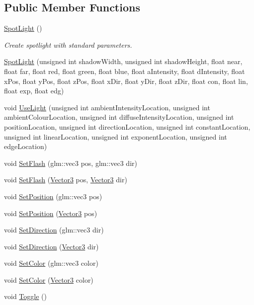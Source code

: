 \subsection*{Public Member Functions}
\begin{DoxyCompactItemize}
\item 
\mbox{\label{class_spot_light_ae4045cd7c8c6d18af39b57c9cf6f9ce6}} 
\mbox{\hyperlink{class_spot_light_ae4045cd7c8c6d18af39b57c9cf6f9ce6}{Spot\+Light}} ()
\begin{DoxyCompactList}\small\item\em Create spotlight with standard parameters. \end{DoxyCompactList}\item 
\mbox{\hyperlink{class_spot_light_a3c6af5cf0f784ab6375f0e12eb72dd55}{Spot\+Light}} (unsigned int shadow\+Width, unsigned int shadow\+Height, float near, float far, float red, float green, float blue, float a\+Intensity, float d\+Intensity, float x\+Pos, float y\+Pos, float z\+Pos, float x\+Dir, float y\+Dir, float z\+Dir, float con, float lin, float exp, float edg)
\item 
void \mbox{\hyperlink{class_spot_light_aa22a17577fb6627b0a68e6f63550e454}{Use\+Light}} (unsigned int ambient\+Intensity\+Location, unsigned int ambient\+Colour\+Location, unsigned int diffuse\+Intensity\+Location, unsigned int position\+Location, unsigned int direction\+Location, unsigned int constant\+Location, unsigned int linear\+Location, unsigned int exponent\+Location, unsigned int edge\+Location)
\item 
void \mbox{\hyperlink{class_spot_light_a817490b0e558cb61aaae8004b6a43275}{Set\+Flash}} (glm\+::vec3 pos, glm\+::vec3 dir)
\item 
void \mbox{\hyperlink{class_spot_light_a56cc5e4470a3be4a032d89987391e226}{Set\+Flash}} (\mbox{\hyperlink{struct_vector3}{Vector3}} pos, \mbox{\hyperlink{struct_vector3}{Vector3}} dir)
\item 
void \mbox{\hyperlink{class_spot_light_a466ca6e419671900b128c4984d1bed9d}{Set\+Position}} (glm\+::vec3 pos)
\item 
void \mbox{\hyperlink{class_spot_light_a84e9c89257d8c097686bcb1ffdb637ac}{Set\+Position}} (\mbox{\hyperlink{struct_vector3}{Vector3}} pos)
\item 
void \mbox{\hyperlink{class_spot_light_aef4f6402b243b594deb090d5a6fc8bac}{Set\+Direction}} (glm\+::vec3 dir)
\item 
void \mbox{\hyperlink{class_spot_light_ae4655dfcad039a909ccef93f3b379261}{Set\+Direction}} (\mbox{\hyperlink{struct_vector3}{Vector3}} dir)
\item 
void \mbox{\hyperlink{class_spot_light_a039e95c52af38632257c43dad6327534}{Set\+Color}} (glm\+::vec3 color)
\item 
void \mbox{\hyperlink{class_spot_light_a55ac1d26c686771c83645397d4612b02}{Set\+Color}} (\mbox{\hyperlink{struct_vector3}{Vector3}} color)
\item 
void \mbox{\hyperlink{class_spot_light_ab0262f44ab1cd6547ca4dce1ca7cffb2}{Toggle}} ()
\end{DoxyCompactItemize}
